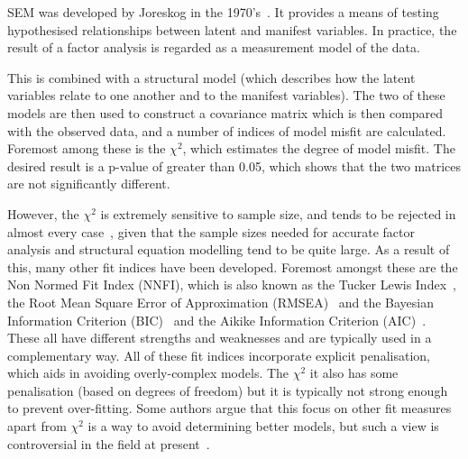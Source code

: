 SEM was developed by Joreskog in the 1970's~\cite{joreskog1978structural}. It provides a means of testing hypothesised relationships between latent and manifest variables. In practice, the result of a factor analysis is regarded as a measurement model of the data.

This is combined with a structural model (which describes how the latent variables relate to one another and to the manifest variables). The two of these models are then used to construct a covariance matrix which is then compared with the observed data, and a number of indices of model misfit are calculated. Foremost among these is the $\chi^2$, which estimates the degree of model misfit. The desired result is a p-value of greater than 0.05, which shows that the two matrices are not significantly different.

However, the $\chi^2$ is extremely sensitive to sample size, and tends to be rejected in almost every case~\cite{henson2006use}, given that the sample sizes needed for accurate factor analysis and structural equation modelling tend to be quite large. As a result of this, many other fit indices have been developed. Foremost amongst these are the Non Normed Fit Index (NNFI), which is also known as the Tucker Lewis Index~\cite{bentler1990comparative}, the Root Mean Square Error of Approximation (RMSEA)~\cite{rigdon1996cfi} and the Bayesian Information Criterion (BIC)~\cite{schwarz1978estimating} and the Aikike Information Criterion (AIC)~\cite{akaike1974new}. These all have different strengths and weaknesses and are typically used in a complementary way. All of these fit indices incorporate explicit penalisation, which aids in avoiding overly-complex models. The $\chi^2$ it also has some penalisation (based on degrees of freedom) but it is typically not strong enough to prevent over-fitting. Some authors argue that this focus on other fit measures apart from $\chi^2$ is a way to avoid determining better models, but such a view is controversial in the field at present~\cite{barrett2007structural}.


